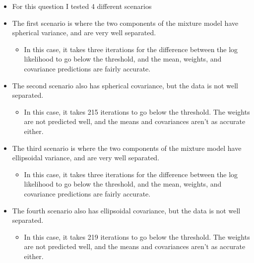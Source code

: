 \documentclass[11pt]{article}
\makeatletter
\providecommand{\tightlist}{%
      \setlength{\itemsep}{0pt}\setlength{\parskip}{0pt}}
\newcommand{\boxspacing}{\kern\kvtcb@left@rule\kern\kvtcb@boxsep}
\newcommand{\prompt}[4]{
        \ttfamily\llap{{\color{#2}[#3]:\hspace{3pt}#4}}\vspace{-\baselineskip}
    }
\makeatother
\begin{document}
\begin{itemize}
\tightlist
\item
  For this question I tested 4 different scenarios
\item
  The first scenario is where the two components of the mixture model
  have spherical variance, and are very well separated.

  \begin{itemize}
  \tightlist
  \item
    In this case, it takes three iterations for the difference between
    the log likelihood to go below the threshold, and the mean, weights,
    and covariance predictions are fairly accurate.
  \end{itemize}
\item
  The second scenario also has spherical covariance, but the data is not
  well separated.

  \begin{itemize}
  \tightlist
  \item
    In this case, it takes 215 iterations to go below the threshold. The
    weights are not predicted well, and the means and covariances aren't
    as accurate either.
  \end{itemize}
\item
  The third scenario is where the two components of the mixture model
  have ellipsoidal variance, and are very well separated.

  \begin{itemize}
  \tightlist
  \item
    In this case, it takes three iterations for the difference between
    the log likelihood to go below the threshold, and the mean, weights,
    and covariance predictions are fairly accurate.
  \end{itemize}
\item
  The fourth scenario also has ellipsoidal covariance, but the data is
  not well separated.

  \begin{itemize}
  \tightlist
  \item
    In this case, it takes 219 iterations to go below the threshold. The
    weights are not predicted well, and the means and covariances aren't
    as accurate either.
  \end{itemize}
\end{itemize}

    \begin{tcolorbox}[breakable, size=fbox, boxrule=1pt, pad at break*=1mm,colback=cellbackground, colframe=cellborder]
\prompt{In}{incolor}{ }{\boxspacing}
\begin{Verbatim}[commandchars=\\\{\}]

\end{Verbatim}
\end{tcolorbox}


    
    
    
\end{document}
